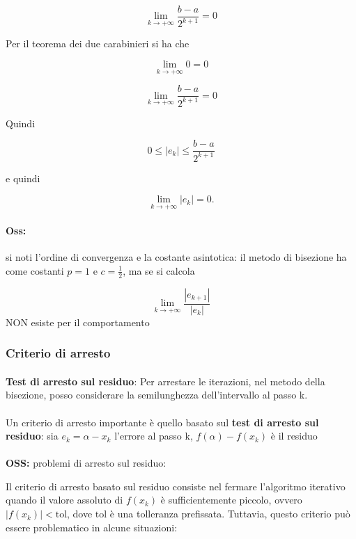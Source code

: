 \documentclass[a4paper, 11pt]{article}
\begin{document}
        \[
            \lim_{k \to +\infty} \frac{b-a}{2^{k+1}} = 0
        \]

        Per il teorema dei due carabinieri si ha che 

        \[
            \lim_{k \to +\infty} 0 = 0
        \]

        \[
            \lim_{k \to +\infty} \frac{b-a}{2^{k+1}} = 0
        \]

        Quindi 

        \[
            0 \leq |e_k| \leq \frac{b-a}{2^{k+1}}
        \]

        e quindi 

        \[
            \lim_{k \to +\infty} |e_k| = 0.
        \]

        \paragraph{Oss: } si noti l'ordine di convergenza e la costante asintotica: il metodo di bisezione ha come costanti $p = 1$ e $c = \frac{1}{2}$, ma se si calcola 

        \[
            \lim_{k \to +\infty} \frac{|e_{k+1}|}{|e_k|}
        \]
        NON esiste per il comportamento

        \subsubsection{Criterio di arresto}
        \paragraph{}
        \textbf{Test di arresto sul residuo}: Per arrestare le iterazioni, nel metodo della bisezione, posso considerare la semilunghezza dell'intervallo al passo k. 

        \paragraph{}
        Un criterio di arresto importante è quello basato sul \textbf{test di arresto sul residuo}: sia $e_k = \alpha - x_k$ l'errore al passo k, $f(\alpha) - f(x_k)$ è il residuo
        \paragraph{}
        \textbf{OSS: } problemi di arresto sul residuo:

        Il criterio di arresto basato sul residuo consiste nel fermare l'algoritmo iterativo quando il valore assoluto di \( f(x_k) \) è sufficientemente piccolo, ovvero \( |f(x_k)| < \text{tol} \), dove \(\text{tol}\) è una tolleranza prefissata. Tuttavia, questo criterio può essere problematico in alcune situazioni:
\end{document}
